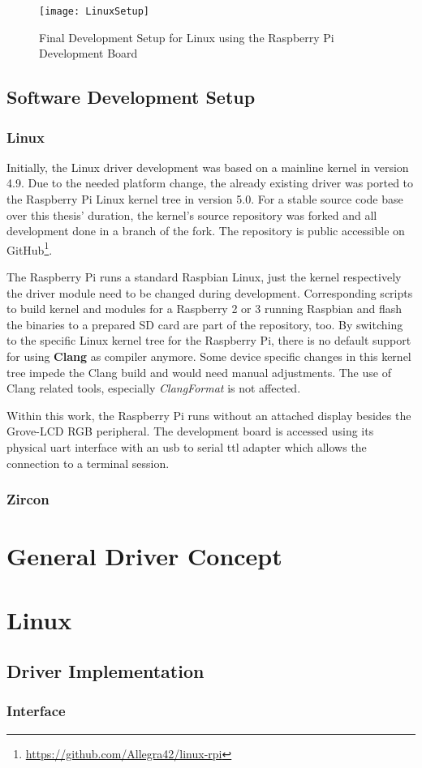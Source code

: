 \begin{figure} [ht]
    \centering
    \texttt{[image: LinuxSetup]}
    \caption{Final Development Setup for Linux using the Raspberry Pi Development Board}\label{pic:linuxsetup}
\end{figure} 


\subsection{Software Development Setup}
\subsubsection*{Linux}
Initially, the Linux driver development was based on a mainline kernel in version 4.9.
Due to the needed platform change, the already existing driver was ported to the Raspberry Pi Linux kernel tree in version 5.0.
For a stable source code base over this thesis' duration, the kernel's source repository was forked and all development done in a branch of the fork.
The repository is public accessible on GitHub\footnote{\url{https://github.com/Allegra42/linux-rpi}}.

The Raspberry Pi runs a standard Raspbian Linux, just the kernel respectively the driver module need to be changed during development.
Corresponding scripts to build kernel and modules for a Raspberry 2 or 3 running Raspbian and flash the binaries to a prepared SD card are part of the repository, too.
By switching to the specific Linux kernel tree for the Raspberry Pi, there is no default support for using \textbf{Clang} as compiler anymore.
Some device specific changes in this kernel tree impede the Clang build and would need manual adjustments.
The use of Clang related tools, especially \textit{ClangFormat} is not affected.

Within this work, the Raspberry Pi runs without an attached display besides the Grove-LCD RGB peripheral.
The development board is accessed using its physical \ac{uart} interface with an \ac{usb} to serial \ac{ttl} adapter which allows the connection to a terminal session.


\subsubsection*{Zircon}

  
\section{General Driver Concept}\label{sec:cs-driver-concept}


\section{Linux}\label{sec:cs-linux}


\subsection{Driver Implementation} %
\subsubsection{Interface} %
